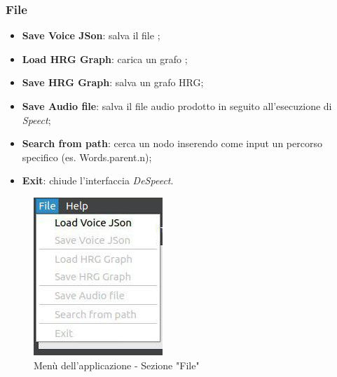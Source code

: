\documentclass[openany,12pt,a4paper]{report}
\begin{document}
 	\subsubsection{File} 
 		\begin{itemize}
 			\item \textbf{Save Voice JSon}: salva il file ;
 			\item \textbf{Load HRG Graph}: carica un grafo ;
 			\item \textbf{Save HRG Graph}: salva un grafo HRG;
 			\item \textbf{Save Audio file}: salva il file audio prodotto in seguito all'esecuzione di \textit{Speect};
 			\item \textbf{Search from path}: cerca un nodo inserendo come input un percorso specifico (es. Words.parent.n);
 			\item \textbf{Exit}: chiude l'interfaccia \textit{DeSpeect}.
 		\end{itemize}
 		
 		\begin{figure}[H]
 			
 			\centering
 			
 			\includegraphics[width=.4\textwidth]{./img/menu_file}
 			
 			\caption{Menù dell'applicazione - Sezione "File"}
 			
 		\end{figure}
 	
\end{document}
